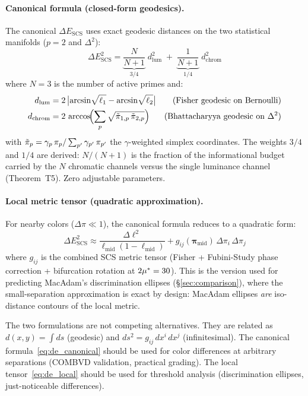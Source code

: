 \documentclass[12pt,a4paper]{article}
\begin{document}
\paragraph{Canonical formula (closed-form geodesics).}
The canonical $\Delta E_{\mathrm{SCS}}$ uses exact geodesic distances
on the two statistical manifolds ($p=2$ and $\Delta^2$):
\begin{equation}
\Delta E_{\mathrm{SCS}}^2 =
  \underbrace{\frac{N}{N+1}}_{3/4}\; d_{\mathrm{lum}}^2 \;+\;
  \underbrace{\frac{1}{N+1}}_{1/4}\; d_{\mathrm{chrom}}^2
\label{eq:de_canonical}
\end{equation}
where $N = 3$ is the number of active primes and:
\begin{align}
  d_{\mathrm{lum}} &= 2\,\bigl|\arcsin\!\sqrt{\ell_1}
    - \arcsin\!\sqrt{\ell_2}\bigr|
    & \text{(Fisher geodesic on Bernoulli)} \\
  d_{\mathrm{chrom}} &= 2\,\arccos\!\Bigl(
    \sum_{p} \sqrt{\tilde{\pi}_{1,p}\,\tilde{\pi}_{2,p}}\Bigr)
    & \text{(Bhattacharyya geodesic on $\Delta^2$)}
\end{align}
with $\tilde{\pi}_p = \gamma_{p}\,\pi_p / \sum_{p'}\gamma_{p'}\,\pi_{p'}$
the $\gamma$-weighted simplex coordinates. The weights $3/4$ and $1/4$
are derived: $N/(N+1)$ is the fraction of the informational budget
carried by the $N$ chromatic channels versus the single luminance
channel (Theorem~T5). Zero adjustable parameters.

\paragraph{Local metric tensor (quadratic approximation).}
For nearby colors ($\Delta\pi \ll 1$), the canonical formula reduces
to a quadratic form:
\begin{equation}
\Delta E_{\mathrm{SCS}}^2 \approx
  \frac{\Delta\ell^2}{\ell_{\mathrm{mid}}(1-\ell_{\mathrm{mid}})}
  + g_{ij}(\bm{\pi}_{\mathrm{mid}}) \, \Delta\pi_i \, \Delta\pi_j
\label{eq:de_local}
\end{equation}
where $g_{ij}$ is the combined SCS metric tensor (Fisher +
Fubini-Study phase correction + bifurcation rotation at $2{\mu^{*}} =
30$). This is the version used for predicting MacAdam's discrimination
ellipses (\S\ref{sec:comparison}), where the small-separation
approximation is exact by design: MacAdam ellipses \emph{are}
iso-distance contours of the local metric.

\begin{remark}
The two formulations are not competing alternatives. They are related
as $d(x,y) = \int ds$ (geodesic) and $ds^2 = g_{ij}\,dx^i\,dx^j$
(infinitesimal). The canonical formula~\eqref{eq:de_canonical} should
be used for color differences at arbitrary separations (COMBVD
validation, practical grading). The local
tensor~\eqref{eq:de_local} should be used for threshold analysis
(discrimination ellipses, just-noticeable differences).
\end{remark}
\end{document}
